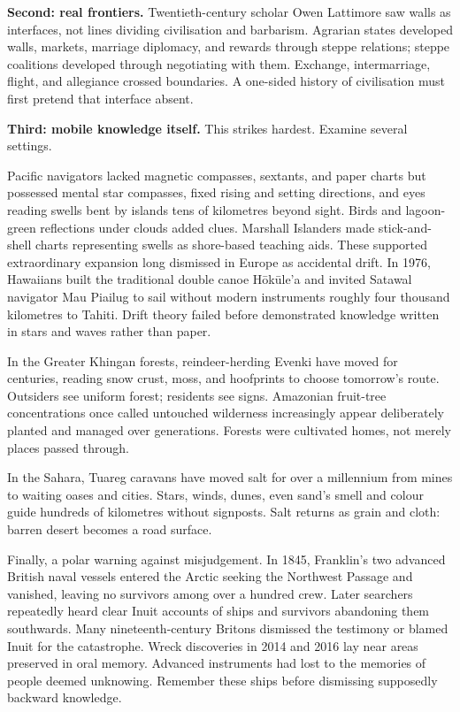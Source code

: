 \textbf{Second: real frontiers.} Twentieth-century scholar Owen Lattimore saw walls as interfaces, not lines dividing civilisation and barbarism. Agrarian states developed walls, markets, marriage diplomacy, and rewards through steppe relations; steppe coalitions developed through negotiating with them. Exchange, intermarriage, flight, and allegiance crossed boundaries. A one-sided history of civilisation must first pretend that interface absent.

\textbf{Third: mobile knowledge itself.} This strikes hardest. Examine several settings.

Pacific navigators lacked magnetic compasses, sextants, and paper charts but possessed mental star compasses, fixed rising and setting directions, and eyes reading swells bent by islands tens of kilometres beyond sight. Birds and lagoon-green reflections under clouds added clues. Marshall Islanders made stick-and-shell charts representing swells as shore-based teaching aids. These supported extraordinary expansion long dismissed in Europe as accidental drift. In 1976, Hawaiians built the traditional double canoe Hōkūle'a and invited Satawal navigator Mau Piailug to sail without modern instruments roughly four thousand kilometres to Tahiti. Drift theory failed before demonstrated knowledge written in stars and waves rather than paper.

In the Greater Khingan forests, reindeer-herding Evenki have moved for centuries, reading snow crust, moss, and hoofprints to choose tomorrow's route. Outsiders see uniform forest; residents see signs. Amazonian fruit-tree concentrations once called untouched wilderness increasingly appear deliberately planted and managed over generations. Forests were cultivated homes, not merely places passed through.

In the Sahara, Tuareg caravans have moved salt for over a millennium from mines to waiting oases and cities. Stars, winds, dunes, even sand's smell and colour guide hundreds of kilometres without signposts. Salt returns as grain and cloth: barren desert becomes a road surface.

Finally, a polar warning against misjudgement. In 1845, Franklin's two advanced British naval vessels entered the Arctic seeking the Northwest Passage and vanished, leaving no survivors among over a hundred crew. Later searchers repeatedly heard clear Inuit accounts of ships and survivors abandoning them southwards. Many nineteenth-century Britons dismissed the testimony or blamed Inuit for the catastrophe. Wreck discoveries in 2014 and 2016 lay near areas preserved in oral memory. Advanced instruments had lost to the memories of people deemed unknowing. Remember these ships before dismissing supposedly backward knowledge.

